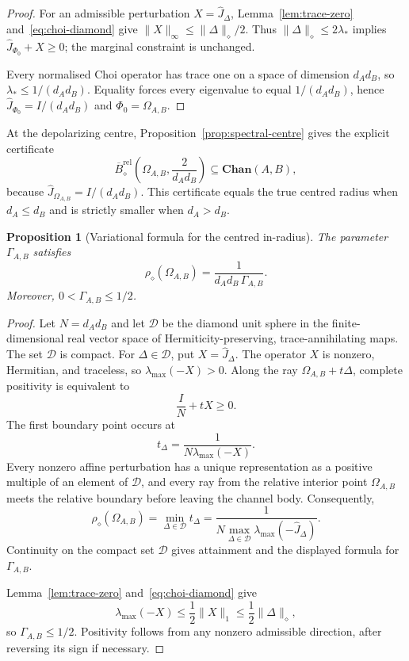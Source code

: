 \documentclass[11pt,a4paper]{article}
\theoremstyle{definition}
\theoremstyle{plain}
\newtheorem{proposition}[theorem]{Proposition}
\theoremstyle{remark}
\newcommand{\Chan}{\mathbf{Chan}}
\begin{document}
\begin{proof}
For an admissible perturbation $X=\widehat J_\Delta$,
Lemma~\ref{lem:trace-zero} and~\eqref{eq:choi-diamond} give
$\|X\|_\infty\leq\|\Delta\|_\diamond/2$. Thus
$\|\Delta\|_\diamond\leq2\lambda_*$ implies
$\widehat J_{\Phi_0}+X\geq0$; the marginal constraint is unchanged.

Every normalised Choi operator has trace one on a space of dimension
$d_Ad_B$, so $\lambda_*\leq1/(d_Ad_B)$. Equality forces every eigenvalue
to equal $1/(d_Ad_B)$, hence
$\widehat J_{\Phi_0}=I/(d_Ad_B)$ and $\Phi_0=\Omega_{A,B}$.
\end{proof}

At the depolarizing centre, Proposition~\ref{prop:spectral-centre} gives the
explicit certificate
\[
\overline B^{\mathrm{rel}}_\diamond
\left(\Omega_{A,B},\frac{2}{d_Ad_B}\right)
\subseteq\Chan(A,B),
\]
because $\widehat J_{\Omega_{A,B}}=I/(d_Ad_B)$. This certificate equals the
true centred radius when $d_A\leq d_B$ and is strictly smaller when
$d_A>d_B$.

\begin{proposition}[Variational formula for the centred in-radius]
\label{prop:inradius-variational}
The parameter $\Gamma_{A,B}$ satisfies
\[
\rho_\diamond(\Omega_{A,B})
=\frac{1}{d_Ad_B\,\Gamma_{A,B}}.
\]
Moreover, $0<\Gamma_{A,B}\leq1/2$.
\end{proposition}

\begin{proof}
Let $N=d_Ad_B$ and let $\mathcal D$ be the diamond unit sphere in the
finite-dimensional real vector space of Hermiticity-preserving,
trace-annihilating maps. The set $\mathcal D$ is compact. For
$\Delta\in\mathcal D$, put $X=\widehat J_\Delta$. The operator $X$ is
nonzero, Hermitian, and traceless, so
$\lambda_{\max}(-X)>0$. Along the ray
$\Omega_{A,B}+t\Delta$, complete positivity is equivalent to
\[
\frac IN+tX\geq0.
\]
The first boundary point occurs at
\[
t_\Delta=\frac{1}{N\lambda_{\max}(-X)}.
\]
Every nonzero affine perturbation has a unique representation as a positive
multiple of an element of $\mathcal D$, and every ray from the relative
interior point $\Omega_{A,B}$ meets the relative boundary before leaving the
channel body. Consequently,
\[
\rho_\diamond(\Omega_{A,B})
=\min_{\Delta\in\mathcal D}t_\Delta
=\frac{1}{N\max_{\Delta\in\mathcal D}
\lambda_{\max}(-\widehat J_\Delta)}.
\]
Continuity on the compact set $\mathcal D$ gives attainment and the displayed
formula for $\Gamma_{A,B}$.

Lemma~\ref{lem:trace-zero} and~\eqref{eq:choi-diamond} give
\[
\lambda_{\max}(-X)
\leq\frac12\|X\|_1
\leq\frac12\|\Delta\|_\diamond,
\]
so $\Gamma_{A,B}\leq1/2$. Positivity follows from any nonzero admissible
direction, after reversing its sign if necessary.
\end{proof}
\end{document}
